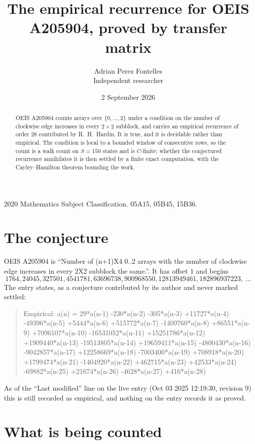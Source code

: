 \documentclass[11pt,a4paper]{article}
\title{The empirical recurrence for OEIS A205904, proved by transfer matrix}
\author{Adrian Perez Fontelles\\ \small Independent researcher}
\date{2 September 2026}
\theoremstyle{plain}
\theoremstyle{definition}
\begin{document}
\maketitle

\begin{abstract}
OEIS A205904 counts arrays over $\{0,\dots,2\}$ under a condition on the number of clockwise edge increases
in every $2\times2$ subblock, and carries an empirical recurrence of order $28$ contributed by
R.~H.~Hardin. It is true, and it is decidable rather than empirical. The condition is local to
a bounded window of consecutive rows, so the count is a walk count on $S=150$ states and is
$C$-finite; whether the conjectured recurrence annihilates it is then settled by a finite exact
computation, with the Cayley--Hamilton theorem bounding the work.
\end{abstract}

\noindent\small 2020 Mathematics Subject Classification. 05A15, 05B45, 15B36.\normalsize

\section{The conjecture}

OEIS A205904 is ``Number of (n+1)X4 0..2 arrays with the number of clockwise edge increases in every 2X2 subblock the same.''. It has offset $1$ and begins
\[
1764, 24045, 327501, 4541781, 63696738, 900968550, 12813949461, 182896937223,\ \dots
\]
The entry states, as a conjecture contributed by its author and never marked settled:
\begin{quote}
Empirical: a(n) = 29*a(n-1) -230*a(n-2) -305*a(n-3) +11727*a(n-4) -49396*a(n-5) +5444*a(n-6) +515772*a(n-7) -1409760*a(n-8) +86551*a(n-9) +7096107*a(n-10) -16531052*a(n-11) +15251786*a(n-12) +1909440*a(n-13) -19513805*a(n-14) +19659411*a(n-15) -4800430*a(n-16) -9042857*a(n-17) +12258669*a(n-18) -7003400*a(n-19) +708918*a(n-20) +1799474*a(n-21) -1404920*a(n-22) +462715*a(n-23) +42533*a(n-24) -69882*a(n-25) +21674*a(n-26) -4628*a(n-27) +416*a(n-28)
\end{quote}
As of the ``Last modified'' line on the live entry (Oct 03 2025 12:19:30, revision 9) this is still
recorded as empirical, and nothing on the entry records it as proved.

\section{What is being counted}
\end{document}
